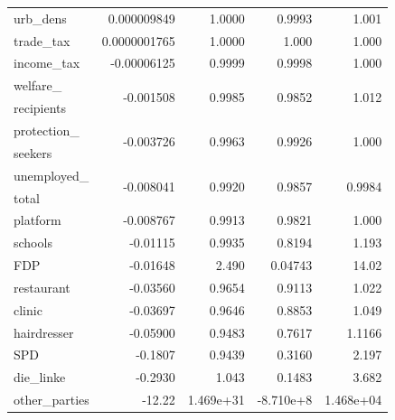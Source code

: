 \begin{table}[H]
\begin{tabular}{l r r r r}
urb\_dens & 0.000009849  & 1.0000 & 0.9993 & 1.001 \\
trade\_tax &  0.0000001765 & 1.0000 & 1.000 & 1.000\\
income\_tax &  -0.00006125 & 0.9999 &  0.9998 & 1.000 \\
welfare\_ & \multirow{2}{*}{-0.001508} & \multirow{2}{*}{0.9985}  & \multirow{2}{*}{0.9852} & \multirow{2}{*}{1.012}\\
recipients \\
protection\_ & \multirow{2}{*}{-0.003726} & \multirow{2}{*}{0.9963}  & \multirow{2}{*}{0.9926} & \multirow{2}{*}{1.000}\\
seekers \\
unemployed\_ & \multirow{2}{*}{-0.008041} & \multirow{2}{*}{0.9920}  & \multirow{2}{*}{0.9857} & \multirow{2}{*}{0.9984} \\
total \\
platform & -0.008767  & 0.9913 &  0.9821 & 1.000 \\
schools & -0.01115  & 0.9935 & 0.8194 & 1.193 \\
FDP & -0.01648  & 2.490 & 0.04743 & 14.02\\
restaurant & -0.03560  & 0.9654 & 0.9113 & 1.022 \\
clinic & -0.03697  & 0.9646 &  0.8853 & 1.049 \\
hairdresser & -0.05900  & 0.9483 & 0.7617 & 1.1166 \\
SPD & -0.1807  & 0.9439 & 0.3160 & 2.197 \\
die\_linke & -0.2930  & 1.043 &  0.1483 & 3.682 \\
other\_parties & -12.22  & 1.469e+31 & -8.710e+8 & 1.468e+04\\
\bottomrule
\end{tabular}
\end{table}